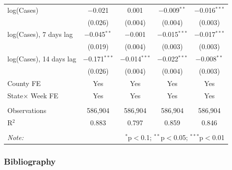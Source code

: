 \documentclass{beamer}
\begin{document}
\begin{frame}
\begin{table}[!htbp]
{\begin{tabular}{@{\extracolsep{1pt}}lcccc}
  log(Cases) & $-$0.021 & 0.001 & $-$0.009$^{**}$ & $-$0.016$^{***}$ \\ 
  & (0.026) & (0.004) & (0.004) & (0.003) \\ 
 log(Cases), 7 days lag & $-$0.045$^{**}$ & $-$0.001 & $-$0.015$^{***}$ & $-$0.017$^{***}$ \\ 
  & (0.019) & (0.004) & (0.003) & (0.003) \\ 
 log(Cases), 14 days lag & $-$0.171$^{***}$ & $-$0.014$^{***}$ & $-$0.022$^{***}$ & $-$0.008$^{**}$ \\ 
  & (0.026) & (0.004) & (0.004) & (0.003) \\  
  \hline \hline
\alert{County FE} & Yes & Yes &  Yes  &  Yes  \\   
\alert{State$\times$ Week FE}&Yes  &  Yes  &  Yes  &  Yes  \\ 
\hline \\[-1.8ex] 
Observations & 586,904 & 586,904 & 586,904 & 586,904 \\ 
R$^{2}$ & 0.883 & 0.797 & 0.859 & 0.846 \\ 
\hline 
\hline \\[-1.8ex] 
\textit{Note:}  & \multicolumn{4}{r}{$^{*}$p$<$0.1; $^{**}$p$<$0.05; $^{***}$p$<$0.01} \\ 
\end{tabular} 
}
\end{table}
 
\end{frame} 



\begin{frame}[allowframebreaks]
\frametitle{Bibliography}
\footnotesize

\end{frame}
\end{document}
